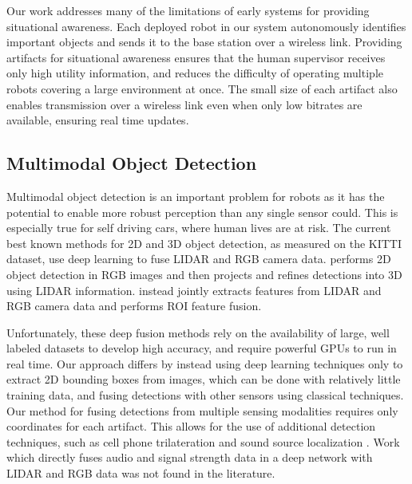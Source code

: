 Our work addresses many of the limitations of early systems for providing situational awareness. Each deployed robot in our system autonomously identifies important objects and sends it to the base station over a wireless link. Providing artifacts for situational awareness ensures that the human supervisor receives only high utility information, and reduces the difficulty of operating multiple robots covering a large environment at once. The small size of each artifact also enables transmission over a wireless link even when only low bitrates are available, ensuring real time updates.

\subsection{Multimodal Object Detection}

Multimodal object detection is an important problem for robots as it has the potential to enable more robust perception than any single sensor could. This is especially true for self driving cars, where human lives are at risk. The current best known methods for 2D and 3D object detection, as measured on the KITTI dataset, use deep learning to fuse LIDAR and RGB camera data. \cite{qi2018frustum} performs 2D object detection in RGB images and then projects and refines detections into 3D using LIDAR information. \cite{liang2019multi} instead jointly extracts features from LIDAR and RGB camera data and performs ROI feature fusion.

Unfortunately, these deep fusion methods rely on the availability of large, well labeled datasets to develop high accuracy, and require powerful GPUs to run in real time. Our approach differs by instead using deep learning techniques only to extract 2D bounding boxes from images, which can be done with relatively little training data, and fusing detections with other sensors using classical techniques. Our method for fusing detections from multiple sensing modalities requires only coordinates for each artifact. This allows for the use of additional detection techniques, such as cell phone trilateration \cite{iglesias2012indoor} and sound source localization \cite{grondin2019lightweight}. Work which directly fuses audio and signal strength data in a deep network with LIDAR and RGB data was not found in the literature.